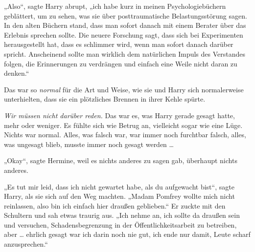 „Also“, sagte Harry abrupt, „ich habe kurz in meinen Psychologiebüchern geblättert, um zu sehen, was sie über posttraumatische Belastungsstörung sagen. In den alten Büchern stand, dass man sofort danach mit einem Berater über das Erlebnis sprechen sollte. Die neuere Forschung sagt, dass sich bei Experimenten herausgestellt hat, dass es schlimmer wird, wenn man sofort danach darüber spricht. Anscheinend sollte man wirklich dem natürlichen Impuls des Verstandes folgen, die Erinnerungen zu verdrängen und einfach eine Weile nicht daran zu denken.“

Das war so \emph{normal} für die Art und Weise, wie sie und Harry sich normalerweise unterhielten, dass sie ein plötzliches Brennen in ihrer Kehle spürte.

\emph{Wir müssen nicht darüber reden.} Das war es, was Harry gerade gesagt hatte, mehr oder weniger. Es fühlte sich wie Betrug an, vielleicht sogar wie eine Lüge. Nichts war normal. Alles, was falsch war, war immer noch furchtbar falsch, alles, was ungesagt blieb, musste immer noch gesagt werden …

„Okay“, sagte Hermine, weil es nichts anderes zu sagen gab, überhaupt nichts anderes.

„Es tut mir leid, dass ich nicht gewartet habe, als du aufgewacht bist“, sagte Harry, als sie sich auf den Weg machten.
„Madam Pomfrey wollte mich nicht reinlassen, also bin ich einfach hier draußen geblieben.“ Er zuckte mit den Schultern und sah etwas traurig aus.
„Ich nehme an, ich sollte da draußen sein und versuchen, Schadensbegrenzung in der Öffentlichkeitsarbeit zu betreiben, aber … ehrlich gesagt war ich darin noch nie gut, ich ende nur damit, Leute scharf anzusprechen.“

